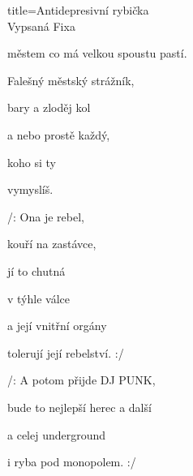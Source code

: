 \begin{song}{title=\centering Antidepresivní rybička \\\normalsize Vypsaná Fixa   \vspace*{-0.3cm}}
{\begin{minipage}[t]{0.48\textwidth}
  městem co má velkou spoustu pastí.

  Falešný městský strážník,

  bary a zloděj kol 
  
  a nebo prostě každý, 

  koho si ty 

  vymyslíš.


\sloka
 /:  Ona je rebel, 
  
  kouří na zastávce,

  jí to chutná  

  v týhle válce 

  a její vnitřní orgány

  tolerují její rebelství. :/

\sloka 
  /: A potom přijde DJ PUNK,

  bude to nejlepší herec a další 

  a celej underground 

  i ryba pod monopolem. :/



\end{minipage}
}
\setcounter{Slokočet}{0}
\end{song}

